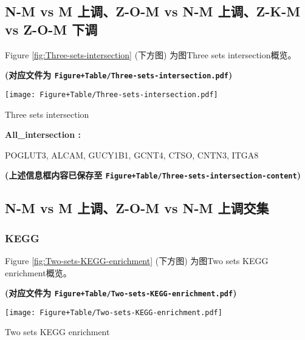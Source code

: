 \documentclass[
]{article}
\begin{document}
\hypertarget{w2-t1}{%
\subsection{N-M vs M 上调、Z-O-M vs N-M 上调、Z-K-M vs Z-O-M 下调}\label{w2-t1}}

Figure \ref{fig:Three-sets-intersection} (下方图) 为图Three sets intersection概览。

\textbf{(对应文件为 \texttt{Figure+Table/Three-sets-intersection.pdf})}

\def\@captype{figure}
\begin{center}
\texttt{[image: Figure+Table/Three-sets-intersection.pdf]}
\caption{Three sets intersection}\label{fig:Three-sets-intersection}
\end{center}
\begin{center}\begin{tcolorbox}[colback=gray!10, colframe=gray!50, width=0.9\linewidth, arc=1mm, boxrule=0.5pt]
\textbf{
All\_intersection
:}

\vspace{0.5em}

    POGLUT3, ALCAM, GUCY1B1, GCNT4, CTSO, CNTN3, ITGA8

\vspace{2em}
\end{tcolorbox}
\end{center}

\textbf{(上述信息框内容已保存至 \texttt{Figure+Table/Three-sets-intersection-content})}

\hypertarget{w2-t2}{%
\subsection{N-M vs M 上调、Z-O-M vs N-M 上调交集}\label{w2-t2}}

\hypertarget{kegg}{%
\subsubsection{KEGG}\label{kegg}}

Figure \ref{fig:Two-sets-KEGG-enrichment} (下方图) 为图Two sets KEGG enrichment概览。

\textbf{(对应文件为 \texttt{Figure+Table/Two-sets-KEGG-enrichment.pdf})}

\def\@captype{figure}
\begin{center}
\texttt{[image: Figure+Table/Two-sets-KEGG-enrichment.pdf]}
\caption{Two sets KEGG enrichment}\label{fig:Two-sets-KEGG-enrichment}
\end{center}
\end{document}
